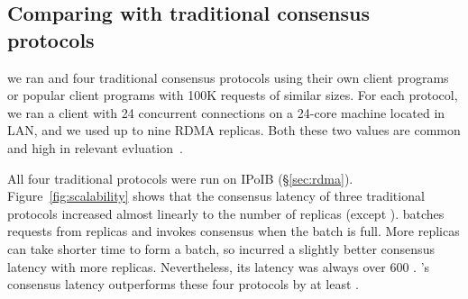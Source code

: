 \subsection{Comparing with traditional consensus protocols}
\label{sec:eval-traditional}

we ran \xxx and four traditional consensus protocols using their own 
client programs or popular client programs with 100K requests of similar sizes. 
For each protocol, we ran a client with 24 concurrent connections on a 24-core 
machine located in LAN, and we used up to nine RDMA replicas. Both these two 
values are common and high in 
relevant evluation~\cite{zookeeper,crane:sosp15,rex:eurosys14,dare:hpdc15}.


All four traditional protocols were run on IPoIB (\S\ref{sec:rdma}). 
Figure~\ref{fig:scalability} shows that the consensus latency of three 
traditional protocols increased almost linearly to the number of replicas 
(except \spaxos). \spaxos batches requests from replicas and invokes consensus 
when the batch is full. More replicas can take shorter time to form a batch, so 
\spaxos incurred a slightly better consensus latency with more replicas. 
Nevertheless, its latency was always over 600 \us. \xxx's consensus latency 
outperforms these four protocols by at least \comptradlow.

